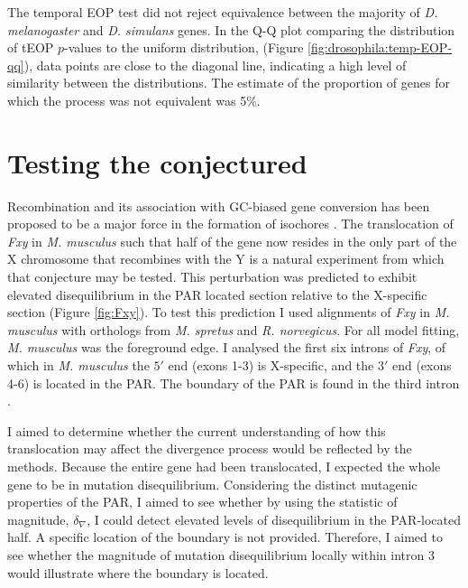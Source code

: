 

The temporal EOP test did not reject equivalence between the majority of \textit{D. melanogaster} and \textit{D. simulans} genes. In the Q-Q plot comparing the distribution of tEOP $p$-values to the uniform distribution, (Figure \ref{fig:drosophila:temp-EOP-qq}), data points are close to the diagonal line, indicating a high level of similarity between the distributions. The estimate of the proportion of genes for which the process was not equivalent was 5\%.



\section{Testing the conjectured}

Recombination and its association with GC-biased gene conversion has been proposed to be a major force in the formation of isochores \citep{Montoya-Burgos2003RecombinationGenomes}. The translocation of \textit{Fxy} in \textit{M. musculus} such that half of the gene now resides in the only part of the X chromosome that recombines with the Y is a natural experiment from which that conjecture may be tested. This perturbation was predicted to exhibit elevated disequilibrium in the PAR located section relative to the X-specific section (Figure \ref{fig:Fxy}). To test this prediction I used alignments of \textit{Fxy} in \textit{M. musculus} with orthologs from \textit{M. spretus} and \textit{R. norvegicus}. For all model fitting, \textit{M. musculus} was the foreground edge. I analysed the first six introns of \textit{Fxy}, of which in \textit{M. musculus} the $5'$ end (exons 1-3) is X-specific, and the $3'$ end (exons 4-6) is located in the PAR. The boundary of the PAR is found in the third intron \citep{Palmer1997AMice}. 

I aimed to determine whether the current understanding of how this translocation may affect the divergence process would be reflected by the methods. Because the entire gene had been translocated, I expected the whole gene to be in mutation disequilibrium. Considering the distinct mutagenic properties of the PAR, I aimed to see whether by using the statistic of magnitude, $\delta_\nabla$, I could detect elevated levels of disequilibrium in the PAR-located half. A specific location of the boundary is not provided. Therefore, I aimed to see whether the magnitude of mutation disequilibrium locally within intron 3 would illustrate where the boundary is located. 

